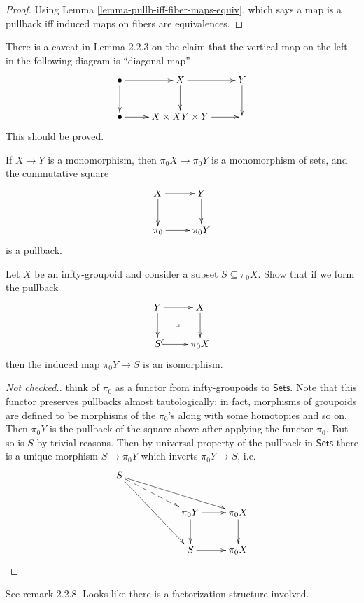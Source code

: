\begin{proof}
Using Lemma
\ref{lemma-pullb-iff-fiber-maps-equiv},
which says a map is a pullback iff induced
maps on fibers are equivalences.
\end{proof}

\begin{remark}
\label{remark-lemma-2.2.3}
There is a caveat in Lemma 2.2.3 on the claim
that the vertical map on the left in the
following
diagram is ``diagonal map''
$$
\xymatrix{
\bullet\ar[r]\ar[d]&X\ar[d]\ar[r]&Y\ar[d]\\
\bullet\ar[r]&X \times X\ar[r]Y \times Y&
}
$$
This should be proved.
\end{remark}

\begin{proposition}
\label{proposition-monom-then-monom-sets}
If $X \to Y$ is a monomorphism, then $\pi_0X
\to \pi_0Y$
is a monomorphism of sets, and the
commutative square
$$
\xymatrix{
X\ar[r]\ar[d]&Y\ar[d]\\
\pi_0\ar[r]&\pi_0Y
}
$$
is a pullback.
\end{proposition}

\begin{exercise}
\label{exercise-2.7}
Let $X$ be an infty-groupoid and consider
a subset $S\subseteq \pi_0X$.
Show that if we form the pullback
$$
\xymatrix{
Y\ar[r]\ar[d]\ar@{}[dr]|-{\lrcorner}&X\ar[d]
\\
S\ar@{^{(}->}[r]&\pi_0X
}
$$
then the induced map $\pi_0Y\to S$ is an
isomorphism.
\end{exercise}

\begin{proof}
[Not checked.]
think of $\pi_0$ as a functor from
infty-groupoids
to $\mathsf{Sets}$. Note that this functor
preserves pullbacks almost tautologically:
in fact, morphisms of groupoids are defined
to be morphisms of the $\pi_0$'s along
with some homotopies and so on. Then
$\pi_0Y$ is the pullback of the square above
after applying the functor $\pi_0$.
But so is $S$ by trivial reasons.
Then by universal property of the pullback
in $\mathsf{Sets}$ there is a unique morphism
$S \to \pi_0Y$ which inverts $\pi_0Y \to S$,
i.e.
$$
\xymatrix{
S \ar[rrrd] \ar@{-->}[rrd] \ar[rrdd] & & \\
& & \pi_0Y \ar[d] \ar[r] & \pi_0X \ar[d] \\
& & S \ar[r] & \pi_0X
}
$$
\end{proof}

\noindent
See remark 2.2.8. Looks like there
is a factorization structure involved.

